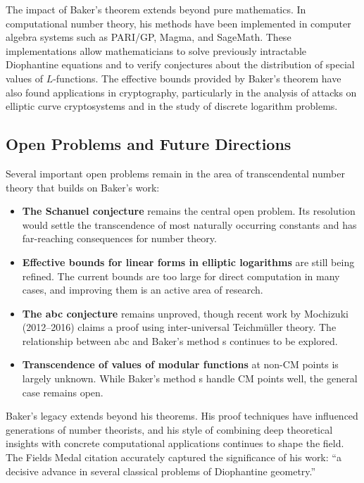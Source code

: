 The impact of Baker's theorem extends beyond pure mathematics. In computational number theory, his methods have been implemented in computer algebra systems such as PARI/GP, Magma, and SageMath. These implementations allow mathematicians to solve previously intractable Diophantine equations and to verify conjectures about the distribution of special values of $L$-functions. The effective bounds provided by Baker's theorem have also found applications in cryptography, particularly in the analysis of attacks on elliptic curve cryptosystems and in the study of discrete logarithm problems.

\subsection*{Open Problems and Future Directions}

Several important open problems remain in the area of transcendental number theory that builds on Baker's work:

\begin{itemize}
    \item \textbf{The Schanuel conjecture} remains the central open problem. Its resolution would settle the transcendence of most naturally occurring constants and has far-reaching consequences for number theory.
    \item \textbf{Effective bounds for linear forms in elliptic logarithms} are still being refined. The current bounds are too large for direct computation in many cases, and improving them is an active area of research.
    \item \textbf{The abc conjecture} remains unproved, though recent work by Mochizuki (2012--2016) claims a proof using inter-universal Teichmüller theory. The relationship between abc and Baker's method \cite{baker1966}s continues to be explored.
    \item \textbf{Transcendence of values of modular functions} at non-CM points is largely unknown. While Baker's method \cite{baker1966}s handle CM points well, the general case remains open.
\end{itemize}

Baker's legacy extends beyond his theorems. His proof techniques have influenced generations of number theorists, and his style of combining deep theoretical insights with concrete computational applications continues to shape the field. The Fields Medal citation accurately captured the significance of his work: ``a decisive advance in several classical problems of Diophantine geometry.''

